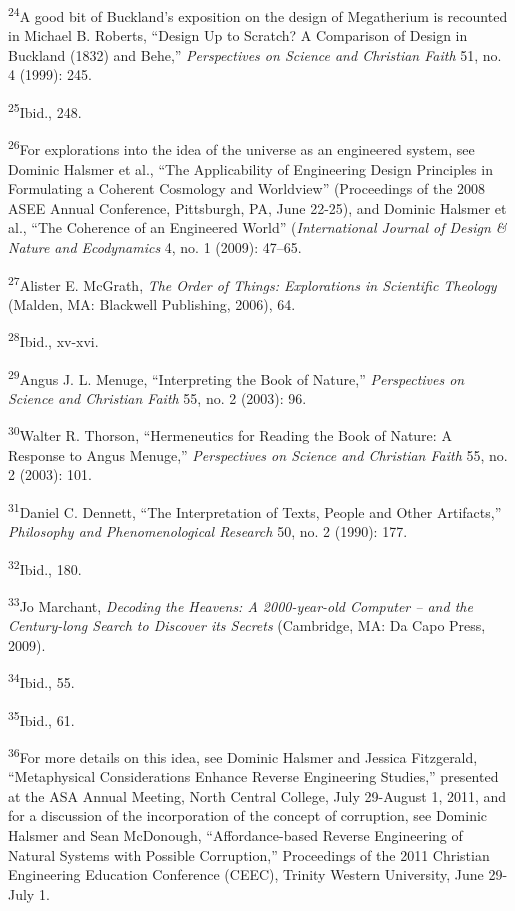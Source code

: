 \textsuperscript{24}A good bit of Buckland’s exposition on the design of
Megatherium is recounted in Michael B. Roberts, “Design Up to Scratch?
A Comparison of Design in Buckland (1832) and Behe,”
\textit{Perspectives on Science and Christian Faith} 51, no. 4 (1999):
245.


\textsuperscript{25}Ibid., 248.


\textsuperscript{26}For explorations into the idea of the universe as an
engineered system, see Dominic Halsmer et al., “The Applicability of
Engineering Design Principles in Formulating a Coherent Cosmology and
Worldview” (Proceedings of the 2008 ASEE Annual Conference, Pittsburgh,
PA, June 22-25), and Dominic Halsmer et al., “The Coherence of an
Engineered World” (\textit{International Journal of Design \& Nature
and Ecodynamics }4, no. 1 (2009): 47–65.


\textsuperscript{27}Alister E. McGrath, \textit{The Order of Things:
Explorations in Scientific Theology} (Malden, MA: Blackwell Publishing,
2006), 64.


\textsuperscript{28}Ibid., xv-xvi.


\textsuperscript{29}Angus J. L. Menuge, “Interpreting the Book of
Nature,” \textit{Perspectives on Science and Christian Faith} 55, no. 2
(2003): 96.


\textsuperscript{30}Walter R. Thorson, “Hermeneutics for Reading the
Book of Nature: A Response to Angus Menuge,” \textit{Perspectives on
Science and Christian Faith} 55, no. 2 (2003): 101.


\textsuperscript{31}Daniel C. Dennett, “The Interpretation of Texts,
People and Other Artifacts,” \textit{Philosophy and Phenomenological
Research} 50, no. 2 (1990): 177.


\textsuperscript{32}Ibid., 180.


\textsuperscript{33}Jo Marchant, \textit{Decoding the Heavens: A
2000-year-old Computer – and the Century-long Search to Discover its
Secrets} (Cambridge, MA: Da Capo Press, 2009).


\textsuperscript{34}Ibid., 55.


\textsuperscript{35}Ibid., 61.


\textsuperscript{36}For more details on this idea, see Dominic Halsmer
and Jessica Fitzgerald, “Metaphysical Considerations Enhance Reverse
Engineering Studies,” presented at the ASA Annual Meeting, North
Central College, July 29-August 1, 2011, and for a discussion of the
incorporation of the concept of corruption, see Dominic Halsmer and
Sean McDonough, “Affordance-based Reverse Engineering of Natural
Systems with Possible Corruption,” Proceedings of the 2011 Christian
Engineering Education Conference (CEEC), Trinity Western University,
June 29-July 1.


